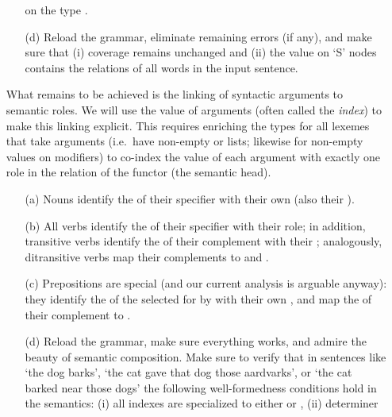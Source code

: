 \documentclass[10pt]{article}
\begin{document}
\begin{enumerate}
\begin{itemize}
                on the type .
          \item [(d)]
                Reload the grammar, eliminate remaining errors (if
                any), and make sure that (i) coverage remains unchanged
                and (ii) the  value on `S' nodes contains the
                relations of all words in the input sentence.
        \end{itemize}
  \item []
        What remains to be achieved is the linking of syntactic
        arguments to semantic roles.  We will use the  value
        of arguments (often called the {\em index\/}) to make this
        linking explicit. 
        This requires enriching the types for all lexemes that take
        arguments (i.e.\ have non-empty  or  lists;
        likewise for non-empty  values on modifiers)
        to co-index the  value of each argument with exactly
        one role in the relation of the functor (the semantic head).
        \begin{itemize}
          \item [(a)]
                Nouns identify the  of their specifier with
                their own  (also their ).
          \item [(b)]
                All verbs identify the  of their specifier
                with their  role; in addition, transitive
                verbs identify the  of their complement with
                their ; analogously, ditransitive verbs map
                their complements to  and .
          \item [(c)]
                Prepositions are special (and our current analysis is
                arguable anyway): they identify the  of the
                 selected for by  with their
                own , and map the  of their
                complement to .
          \item [(d)]
                Reload the grammar, make sure everything works, and
                admire the beauty of semantic composition.  Make sure
                to verify that in sentences like `the dog barks', `the
                cat gave that dog those aardvarks', or `the cat barked near
                those dogs' the following well-formedness conditions
                hold in the semantics: (i) all indexes are specialized to
                either  or , (ii) determiner

\end{itemize}
\end{enumerate}
\end{document}
